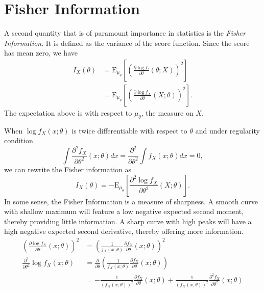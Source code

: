 \section{Fisher Information}

A second quantity that is of paramount importance in statistics is the \emph{Fisher Information}.
It is defined as the variance of the score function.
Since the score has mean zero, we have
\begin{equation*}
\begin{split}
I_X (\theta)
&= \mathrm{E}_{\mu_{\theta}} \left[ \left( \frac{\partial \log L}{\partial \theta} (\theta; X) \right)^2 \right] \\
&= \mathrm{E}_{\mu_{\theta}} \left[ \left( \frac{\partial \log f_X}{\partial \theta} (X; \theta) \right)^2 \right] .
\end{split}
\end{equation*}
The expectation above is with respect to $\mu_{\theta}$, the measure on $X$.

When $\log f_X (x; \theta)$ is twice differentiable with respect to $\theta$ and under regularity condition
\begin{equation*}
\int \frac{\partial^2 f_X}{\partial \theta^2} (x; \theta) dx
= \frac{\partial^2}{\partial \theta^2} \int f_X (x; \theta) dx = 0 ,
\end{equation*}
we can rewrite the Fisher information as
\begin{equation} \label{equation:FisherInformation2}
I_X (\theta)
= - \mathrm{E}_{\mu_{\theta}} \left[ \frac{\partial^2 \log f_X}{\partial \theta^2} (X; \theta) \right] .
\end{equation}
In some sense, the Fisher Information is a measure of sharpness.
A smooth curve with shallow maximum will feature a low negative expected second moment, thereby providing little information.
A sharp curve with high peaks will have a high negative expected second derivative, thereby offering more information.
\begin{equation*}
\begin{split}
\left( \frac{\partial \log f_X}{\partial \theta} (x; \theta) \right)^2
&= \left( \frac{1}{f_X (x; \theta)} \frac{\partial f_X}{\partial \theta} (x; \theta) \right)^2 \\
\frac{\partial^2}{\partial \theta^2} \log f_X (x; \theta)
&= \frac{\partial}{\partial \theta} \left( \frac{1}{f_X (x; \theta)} \frac{\partial f_X}{\partial \theta} (x; \theta) \right) \\
&= - \frac{1}{\left( f_X (x; \theta) \right)^2 } \frac{\partial f_X}{\partial \theta} (x; \theta)
+ \frac{1}{\left( f_X (x; \theta) \right)^2 } \frac{\partial^2 f_X}{\partial \theta^2} (x; \theta)
\end{split}
\end{equation*}

